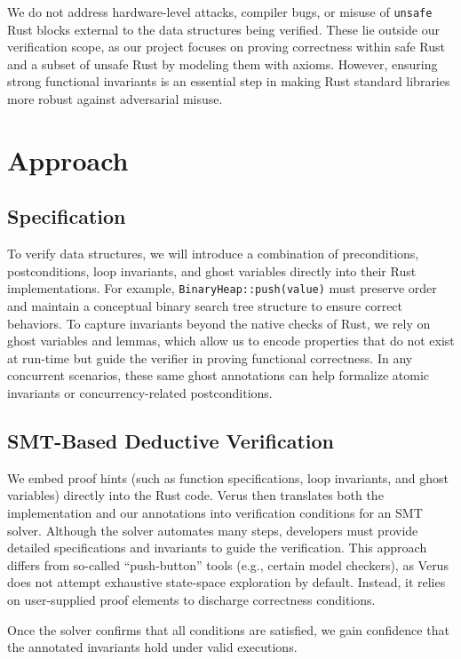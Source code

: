 \documentclass[conference]{IEEEtran}
\begin{document}
We do not address hardware-level attacks, compiler bugs, or misuse of \texttt{unsafe} Rust blocks external to the data structures being verified. These lie outside our verification scope, as our project focuses on proving correctness within safe Rust and a subset of unsafe Rust by modeling them with axioms. However, ensuring strong functional invariants is an essential step in making Rust standard libraries more robust against adversarial misuse.

\section{Approach}

\subsection{Specification}
To verify data structures, we will introduce a combination of preconditions, postconditions, loop invariants, and ghost variables directly into their Rust implementations. For example, \texttt{BinaryHeap::push(value)} must preserve order and maintain a conceptual binary search tree structure to ensure correct behaviors. To capture invariants beyond the native checks of Rust, we rely on ghost variables and lemmas, which allow us to encode properties that do not exist at run-time but guide the verifier in proving functional correctness. In any concurrent scenarios, these same ghost annotations can help formalize atomic invariants or concurrency-related postconditions.

\subsection{SMT-Based Deductive Verification}

We embed proof hints (such as function specifications, loop invariants, and ghost variables) directly into the Rust code. Verus then translates both the implementation and our annotations into verification conditions for an SMT solver. Although the solver automates many steps, developers must provide detailed specifications and invariants to guide the verification. This approach differs from so-called “push-button” tools (e.g., certain model checkers), as Verus does not attempt exhaustive state-space exploration by default. Instead, it relies on user-supplied proof elements to discharge correctness conditions. 

Once the solver confirms that all conditions are satisfied, we gain confidence that the annotated invariants hold under valid executions.
\end{document}
